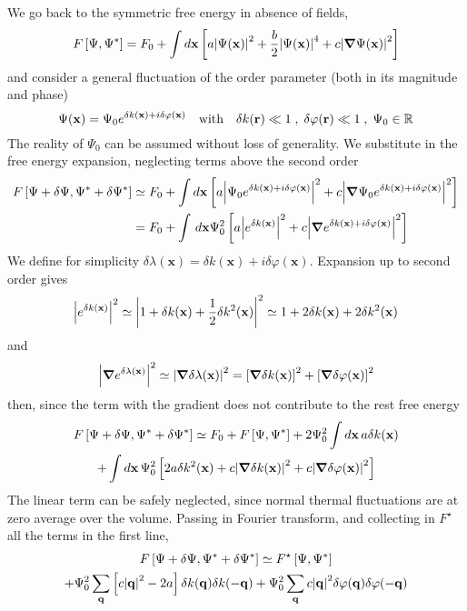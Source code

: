 We go back to the symmetric free energy in absence of fields,
\[ 
    F\left[{\Psi,\Psi^*}\right] = F_0 + \int d\mathbf{x} \left[{
        a \abs{\Psi(\mathbf{x)} }^2 + \frac{b}{2} \abs{ \Psi(\mathbf{x)} }^4 + c \abs{\grad \Psi(\mathbf{x)} }^2
    }\right]
\]
and consider a general fluctuation of the order parameter (both in its magnitude and phase)
\[
    \Psi(\mathbf{x}) = \Psi_0 e^{\delta k(\mathbf{x}) + i \delta \varphi(\mathbf{x})}
    \qq{with}
    \delta k(\mathbf{r}) \ll 1
    \;,\;
    \delta \varphi(\mathbf{r}) \ll 1
    \;,\;
    \Psi_0 \in \R
\]
The reality of $\Psi_0$ can be assumed without loss of generality. We substitute in the free energy expansion, neglecting terms above the second order
\[
\begin{aligned}
    F\left[{\Psi + \delta\Psi,\Psi^* + \delta\Psi^*}\right] &\simeq F_0 + \int d\mathbf{x} \left[{
        a \abs{ \Psi_0 e^{\delta k(\mathbf{x}) + i \delta \varphi(\mathbf{x})} }^2+ c \abs{\grad \Psi_0 e^{\delta k(\mathbf{x}) + i \delta \varphi(\mathbf{x})} }^2
    }\right] \\
    &= F_0 + \int \, d\mathbf{x} \Psi_0^2 \left[{
        a \abs{ e^{\delta k(\mathbf{x})} }^2+ c \abs{\grad  e^{\delta k(\mathbf{x}) + i \delta \varphi(\mathbf{x})} }^2
    }\right]
\end{aligned}
\]
We define for simplicity $\delta\lambda(\mathbf{x}) = \delta k(\mathbf{x}) + i \delta\varphi(\mathbf{x})$. Expansion up to second order gives
\[
    \abs{ e^{\delta k(\mathbf{x})} }^2 \simeq \abs{ 1 + \delta k (\mathbf{x}) + \half \delta k^2(\mathbf{x}) }^2 \simeq 1 + 2 \delta k (\mathbf{x}) + 2  \delta k^2 (\mathbf{x})
\]
and
\[
    \abs{ \grad e^{\delta \lambda(\mathbf{x})} }^2 \simeq \abs{\grad \delta \lambda(\mathbf{x})}^2
    = \left[{\grad \delta k (\mathbf{x})}\right]^2 + \left[{\grad \delta \varphi (\mathbf{x})}\right]^2
\]
then, since the term with the gradient does not contribute to the rest free energy
\begin{multline*}
    F \left[{\Psi + \delta\Psi,\Psi^* + \delta\Psi^*}\right] \simeq F_0 + F \left[{\Psi,\Psi^*}\right] + 2 \Psi_0^2 \int d\mathbf{x} \, a \delta k(\mathbf{x}) \\
    + \int d\mathbf{x} \, \Psi_0^2 \left[{ 2 a \delta k^2 (\mathbf{x}) + c \abs{\grad \delta k (\mathbf{x})}^2 + c \abs{\grad \delta \varphi (\mathbf{x})}^2 }\right]
\end{multline*}
The linear term can be safely neglected, since normal thermal fluctuations are at zero average over the volume. Passing in Fourier transform, and collecting in $F^\star$ all the terms in the first line,
\begin{multline*}
    F \left[{\Psi + \delta\Psi,\Psi^* + \delta\Psi^*}\right] \simeq F^\star \left[{ \Psi,\Psi^* }\right] \\
    + \Psi_0^2 \sum_\mathbf{q} \left[{ c \abs{\mathbf{q}}^2 - 2a }\right] \delta k( \mathbf{q} ) \delta k (-\mathbf{q}) + \Psi_0^2 \sum_\mathbf{q} c \abs{\mathbf{q}}^2 \delta \varphi( \mathbf{q} ) \delta \varphi (-\mathbf{q})
\end{multline*}
